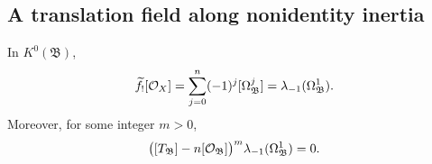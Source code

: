 \subsection{A translation field along nonidentity inertia}

\begin{lemma}\label{quot:k-identity}
In \(K^0(\mathfrak B)\),
\begin{equation}\label{quot:direct-image}
       \widetilde f_![\mathcal O_X]
       =\sum_{j=0}^{n}(-1)^j[\Omega^j_{\mathfrak B}]
       =\lambda_{-1}(\Omega^1_{\mathfrak B}).
\end{equation}
Moreover, for some integer \(m>0\),
\begin{equation}\label{quot:nilpotence}
  \bigl([T_{\mathfrak B}]-n[\mathcal O_{\mathfrak B}]\bigr)^m
                \lambda_{-1}(\Omega^1_{\mathfrak B})=0 .
\end{equation}
\end{lemma}

